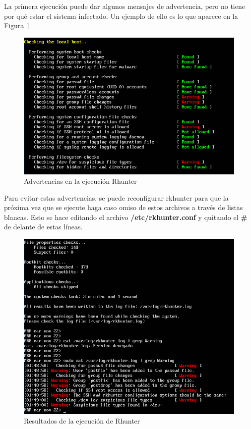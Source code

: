 \begin{itemize}
\newpage

	 La primera ejecución puede dar algunos mensajes de advertencia, pero no tiene por qué estar el sistema infectado. Un ejemplo de ello es lo que aparece en la Figura \ref{fig:figura86}
	 
	 \begin{figure}[H] %
	 	\centering
	 	\includegraphics[scale=0.5]{figuras/figura86.png} 
	 	\caption{Advertencias en la ejecución Rhunter} 
	 	\label{fig:figura86}
	 \end{figure}
 
	 Para evitar estas advertencias, se puede reconfigurar rkhunter para que la próxima vez que se ejecute haga caso omiso de estos archivos a través de listas blancas. Esto se hace editando el archivo \textbf{/etc/rkhunter.conf} y quitando el \textbf{\#} de delante de estas líneas.
	 
	 \begin{figure}[H] %
	 	\centering
	 	\includegraphics[scale=0.4]{figuras/figura87.png} 
	 	\caption{Resultados de la ejecución de Rhunter} 
	 	\label{fig:figura87}
	 \end{figure}
	 

\end{itemize}
